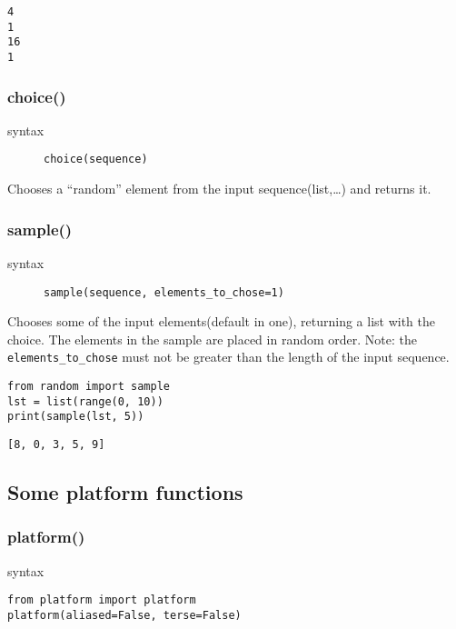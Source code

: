 \documentclass[11pt]{article}
\begin{document}
\begin{verbatim}
4
1
16
1
\end{verbatim}

\subsubsection{choice()}
\label{sec:orgf0d3ad2}
\begin{description}
\item[{syntax}] \texttt{choice(sequence)}
\end{description}
Chooses a “random” element from the input sequence(list,\ldots{}) and
returns it.
\subsubsection{sample()}
\label{sec:org64badb0}
\begin{description}
\item[{syntax}] \texttt{sample(sequence, elements\_to\_chose=1)}
\end{description}
Chooses some of the input elements(default in one), returning a list with the
choice. The elements in the sample are placed in random order. Note:
the \texttt{elements\_to\_chose} must not be greater than the length of the input
sequence.


\begin{verbatim}
from random import sample
lst = list(range(0, 10))
print(sample(lst, 5))
\end{verbatim}

\begin{verbatim}
[8, 0, 3, 5, 9]
\end{verbatim}


\newpage

\subsection{Some platform functions}
\label{sec:orga9c520b}
\subsubsection{platform()}
\label{sec:orgf350ac3}
\begin{description}
\item[{syntax}] 
\end{description}
\begin{verbatim}
from platform import platform
platform(aliased=False, terse=False)
\end{verbatim}
\end{document}

